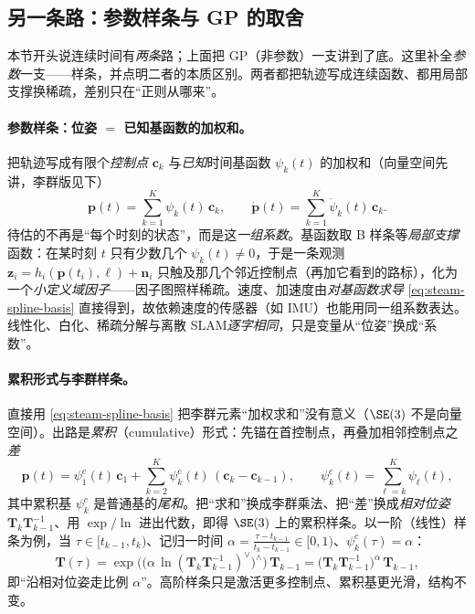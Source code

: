 \subsection{另一条路：参数样条与 GP 的取舍}
\label{sec:est-steam-spline}

本节开头说连续时间有\emph{两条}路；上面把 GP（非参数）一支讲到了底。这里补全\emph{参数}一支——样条，并点明二者的本质区别。两者都把轨迹写成连续函数、都用局部支撑换稀疏，差别只在“正则从哪来”。

\paragraph{参数样条：位姿 $=$ 已知基函数的加权和。}
把轨迹写成有限个\emph{控制点} $\mathbf{c}_k$ 与\emph{已知}时间基函数 $\psi_k(t)$ 的加权和\cite{carlone2026handbook}（向量空间先讲，李群版见下）
\begin{equation}
  \mathbf{p}(t)=\sum_{k=1}^{K}\psi_k(t)\,\mathbf{c}_k,\qquad
  \dot{\mathbf{p}}(t)=\sum_{k=1}^{K}\dot{\psi}_k(t)\,\mathbf{c}_k .
  \label{eq:steam-spline-basis}
\end{equation}
待估的不再是“每个时刻的状态”，而是这\emph{一组系数}。基函数取 B 样条等\emph{局部支撑}函数：在某时刻 $t$ 只有少数几个 $\psi_k(t)\ne0$，于是一条观测 $\mathbf{z}_i=h_i(\mathbf{p}(t_i),\boldsymbol{\ell})+\mathbf{n}_i$ 只触及那几个邻近控制点（再加它看到的路标），化为一个\emph{小定义域因子}——因子图照样稀疏。速度、加速度由\emph{对基函数求导} \cref{eq:steam-spline-basis} 直接得到，故依赖速度的传感器（如 IMU）也能用同一组系数表达。线性化、白化、稀疏分解与离散 SLAM\emph{逐字相同}，只是变量从“位姿”换成“系数”。

\paragraph{累积形式与李群样条。}
直接用 \cref{eq:steam-spline-basis} 把李群元素“加权求和”没有意义（$\SE(3)$ 不是向量空间）。出路是\emph{累积}（cumulative）形式：先锚在首控制点，再叠加相邻控制点之\emph{差}
\begin{equation}
  \mathbf{p}(t)=\psi_1^c(t)\,\mathbf{c}_1+\sum_{k=2}^{K}\psi_k^c(t)\,(\mathbf{c}_k-\mathbf{c}_{k-1}),
  \qquad \psi_k^c(t)=\sum_{\ell=k}^{K}\psi_\ell(t),
  \label{eq:steam-spline-cumul}
\end{equation}
其中累积基 $\psi_k^c$ 是普通基的\emph{尾和}。把“求和”换成李群乘法、把“差”换成\emph{相对位姿} $\mathbf{T}_k\mathbf{T}_{k-1}^{-1}$、用 $\exp/\ln$ 进出代数，即得 $\SE(3)$ 上的累积样条。以一阶（线性）样条为例，当 $\tau\in[t_{k-1},t_k)$、记归一时间 $\alpha=\tfrac{\tau-t_{k-1}}{t_k-t_{k-1}}\in[0,1)$、$\psi_k^c(\tau)=\alpha$：
\begin{equation}
  \mathbf{T}(\tau)=\exp\!\Big(\big(\alpha\,\ln(\mathbf{T}_k\mathbf{T}_{k-1}^{-1})^\vee\big)^{\wedge}\Big)\,\mathbf{T}_{k-1}
  =\big(\mathbf{T}_k\mathbf{T}_{k-1}^{-1}\big)^{\alpha}\,\mathbf{T}_{k-1},
  \label{eq:steam-spline-lie}
\end{equation}
即“沿相对位姿走比例 $\alpha$”。高阶样条只是激活更多控制点、累积基更光滑，结构不变。

